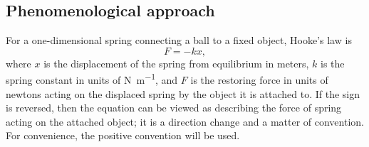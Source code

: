 \documentclass[%
class = book,%
crop = false,%
float = true,%
multi = true,%
preview = false,%
]{standalone}
\begin{document}
\subsection{Phenomenological approach}
\label{ssec:phenomenological-approach}

For a one-dimensional spring connecting a ball to a fixed object, Hooke's law is
\begin{equation}
  \label{eq:hooke_1d}
  F = -k x,
\end{equation}
where \(x\) is the displacement of the spring from equilibrium in meters, \(k\) is the spring constant in units of \si{\newton\per\meter}, and \(F\) is the restoring force in units of newtons acting on the displaced spring by the object it is attached to. If the sign is reversed, then the equation can be viewed as describing the force of spring acting on the attached object; it is a direction change and a matter of convention. For convenience, the positive convention will be used.
\end{document}
